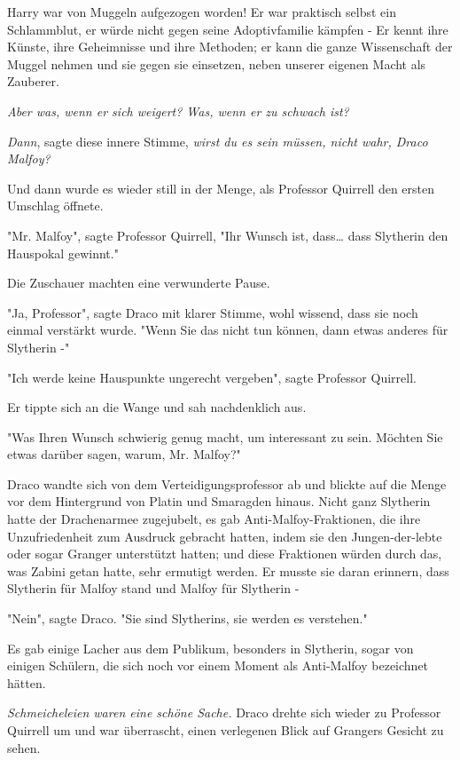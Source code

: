 {Harry war von Muggeln aufgezogen worden! Er war praktisch selbst ein Schlammblut, er würde nicht gegen seine Adoptivfamilie kämpfen - Er kennt ihre Künste, ihre Geheimnisse und ihre Methoden; er kann die ganze Wissenschaft der Muggel nehmen und sie gegen sie einsetzen, neben unserer eigenen Macht als Zauberer.

\emph{Aber was, wenn er sich weigert? Was, wenn er zu schwach ist?}

\emph{Dann}, sagte diese innere Stimme, \emph{wirst du es sein müssen, nicht wahr, Draco Malfoy?}

Und dann wurde es wieder still in der Menge, als Professor Quirrell den ersten Umschlag öffnete.

"Mr. Malfoy", sagte Professor Quirrell, "Ihr Wunsch ist, dass… dass Slytherin den Hauspokal gewinnt."

Die Zuschauer machten eine verwunderte Pause.

"Ja, Professor", sagte Draco mit klarer Stimme, wohl wissend, dass sie noch einmal verstärkt wurde. "Wenn Sie das nicht tun können, dann etwas anderes für Slytherin -"

"Ich werde keine Hauspunkte ungerecht vergeben", sagte Professor Quirrell.

Er tippte sich an die Wange und sah nachdenklich aus.

"Was Ihren Wunsch schwierig genug macht, um interessant zu sein. Möchten Sie etwas darüber sagen, warum, Mr. Malfoy?"

Draco wandte sich von dem Verteidigungsprofessor ab und blickte auf die Menge vor dem Hintergrund von Platin und Smaragden hinaus. Nicht ganz Slytherin hatte der Drachenarmee zugejubelt, es gab Anti-Malfoy-Fraktionen, die ihre Unzufriedenheit zum Ausdruck gebracht hatten, indem sie den Jungen-der-lebte oder sogar Granger unterstützt hatten; und diese Fraktionen würden durch das, was Zabini getan hatte, sehr ermutigt werden. Er musste sie daran erinnern, dass Slytherin für Malfoy stand und Malfoy für Slytherin -

"Nein", sagte Draco. "Sie sind Slytherins, sie werden es verstehen."

Es gab einige Lacher aus dem Publikum, besonders in Slytherin, sogar von einigen Schülern, die sich noch vor einem Moment als Anti-Malfoy bezeichnet hätten.

\emph{Schmeicheleien waren eine schöne Sache.} Draco drehte sich wieder zu Professor Quirrell um und war überrascht, einen verlegenen Blick auf Grangers Gesicht zu sehen.

}
